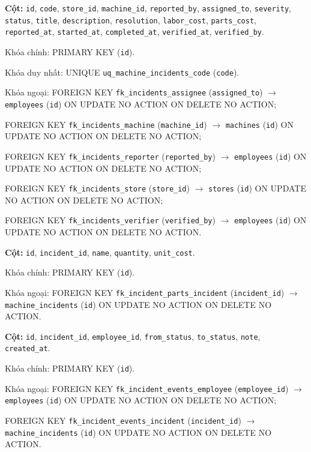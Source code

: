 \begin{description}[leftmargin=3.6cm,labelwidth=3.4cm,style=nextline]
\item[\texttt{machine\_incidents}] \textbf{Cột:} \texttt{id}, \texttt{code}, \texttt{store\_id}, \texttt{machine\_id}, \texttt{reported\_by}, \texttt{assigned\_to}, \texttt{severity}, \texttt{status}, \texttt{title}, \texttt{description}, \texttt{resolution}, \texttt{labor\_cost}, \texttt{parts\_cost}, \texttt{reported\_at}, \texttt{started\_at}, \texttt{completed\_at}, \texttt{verified\_at}, \texttt{verified\_by}.

Khóa chính: PRIMARY KEY (\texttt{id}).

Khóa duy nhất: UNIQUE \texttt{uq\_machine\_incidents\_code} (\texttt{code}).

Khóa ngoại: FOREIGN KEY \texttt{fk\_incidents\_assignee} (\texttt{assigned\_to}) $\rightarrow$ \texttt{employees} (\texttt{id}) ON UPDATE NO ACTION ON DELETE NO ACTION;\par FOREIGN KEY \texttt{fk\_incidents\_machine} (\texttt{machine\_id}) $\rightarrow$ \texttt{machines} (\texttt{id}) ON UPDATE NO ACTION ON DELETE NO ACTION;\par FOREIGN KEY \texttt{fk\_incidents\_reporter} (\texttt{reported\_by}) $\rightarrow$ \texttt{employees} (\texttt{id}) ON UPDATE NO ACTION ON DELETE NO ACTION;\par FOREIGN KEY \texttt{fk\_incidents\_store} (\texttt{store\_id}) $\rightarrow$ \texttt{stores} (\texttt{id}) ON UPDATE NO ACTION ON DELETE NO ACTION;\par FOREIGN KEY \texttt{fk\_incidents\_verifier} (\texttt{verified\_by}) $\rightarrow$ \texttt{employees} (\texttt{id}) ON UPDATE NO ACTION ON DELETE NO ACTION.

\item[\texttt{machine\_incident\_parts}] \textbf{Cột:} \texttt{id}, \texttt{incident\_id}, \texttt{name}, \texttt{quantity}, \texttt{unit\_cost}.

Khóa chính: PRIMARY KEY (\texttt{id}).

Khóa ngoại: FOREIGN KEY \texttt{fk\_incident\_parts\_incident} (\texttt{incident\_id}) $\rightarrow$ \texttt{machine\_incidents} (\texttt{id}) ON UPDATE NO ACTION ON DELETE NO ACTION.

\item[\texttt{machine\_incident\_events}] \textbf{Cột:} \texttt{id}, \texttt{incident\_id}, \texttt{employee\_id}, \texttt{from\_status}, \texttt{to\_status}, \texttt{note}, \texttt{created\_at}.

Khóa chính: PRIMARY KEY (\texttt{id}).

Khóa ngoại: FOREIGN KEY \texttt{fk\_incident\_events\_employee} (\texttt{employee\_id}) $\rightarrow$ \texttt{employees} (\texttt{id}) ON UPDATE NO ACTION ON DELETE NO ACTION;\par FOREIGN KEY \texttt{fk\_incident\_events\_incident} (\texttt{incident\_id}) $\rightarrow$ \texttt{machine\_incidents} (\texttt{id}) ON UPDATE NO ACTION ON DELETE NO ACTION.

\end{description}

